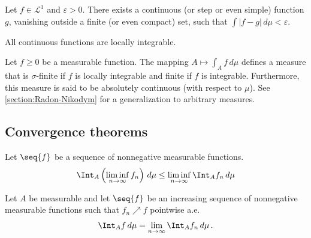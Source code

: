     \begin{property}
        Let $f\in\mathcal{L}^1$ and $\varepsilon>0$. There exists a continuous (or step or even simple) function $g$, vanishing outside a finite (or even compact) set, such that $\int|f-g|\,d\mu<\varepsilon$.
    \end{property}

    \begin{example}
        All continuous functions are locally integrable.
    \end{example}

    \begin{property}\label{measure:measure_by_integral}
        Let $f\geq0$ be a measurable function. The mapping $A\mapsto\int_Af\,d\mu$ defines a measure that is $\sigma$-finite if $f$ is locally integrable and finite if $f$ is integrable. Furthermore, this measure is said to be absolutely continuous (with respect to $\mu$). See \cref{section:Radon-Nikodym} for a generalization to arbitrary measures.
    \end{property}

\subsection{Convergence theorems}

    \begin{theorem}\label{measure:fatous_lemma}
        Let $\seq{f}$ be a sequence of nonnegative measurable functions.
        \begin{gather}
            \Int_A\left(\liminf_{n\rightarrow\infty}f_n\right)\,d\mu \leq \liminf_{n\rightarrow\infty}\Int_Af_n\,d\mu
        \end{gather}
    \end{theorem}
    \begin{theorem}\label{measure:monotone_convergence_theorem}
        Let $A$ be measurable and let $\seq{f}$ be an increasing sequence of nonnegative measurable functions such that $f_n\nearrow f$ pointwise a.e.
        \begin{gather}
            \Int_Af\,d\mu = \lim_{n\rightarrow\infty}\Int_Af_n\,d\mu\,.
        \end{gather}
    \end{theorem}

